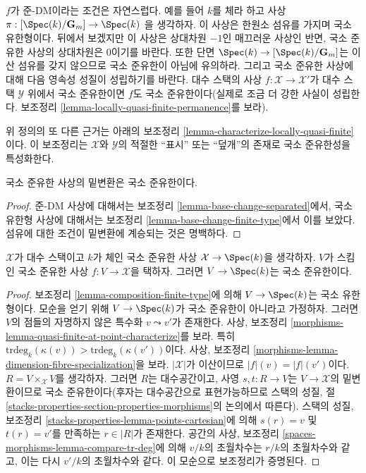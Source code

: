 \noindent
$f$가 준-DM이라는 조건은 자연스럽다. 예를 들어 $k$를 체라 하고 사상
$\pi : [\Spec(k)/\mathbf{G}_m] \to \Spec(k)$
을 생각하자. 이 사상은 한원소 섬유를 가지며 국소 유한형이다.
뒤에서 보겠지만 이 사상은 상대차원 $-1$인 매끄러운 사상인 반면,
국소 준유한 사상의 상대차원은 $0$이기를 바란다. 또한 단면
$\Spec(k) \to [\Spec(k)/\mathbf{G}_m]$는 이산 섬유를 갖지 않으므로
국소 준유한이 아님에 유의하라. 그리고 국소 준유한 사상에 대해 다음
영속성 성질이 성립하기를 바란다. 대수 스택의 사상
$f : \mathcal{X} \to \mathcal{X}'$가 대수 스택 $\mathcal{Y}$ 위에서
국소 준유한이면 $f$도 국소 준유한이다(실제로 조금 더 강한 사실이
성립한다. 보조정리 \ref{lemma-locally-quasi-finite-permanence}를 보라).

\medskip\noindent
위 정의의 또 다른 근거는 아래의 보조정리
\ref{lemma-characterize-locally-quasi-finite}이다. 이 보조정리는
$\mathcal{X}$와 $\mathcal{Y}$의 적절한 ``표시'' 또는 ``덮개''의 존재로
국소 준유한성을 특성화한다.

\begin{lemma}
\label{lemma-base-change-locally-quasi-finite}
국소 준유한 사상의 밑변환은 국소 준유한이다.
\end{lemma}

\begin{proof}
준-DM 사상에 대해서는 보조정리 \ref{lemma-base-change-separated}에서,
국소 유한형 사상에 대해서는 보조정리
\ref{lemma-base-change-finite-type}에서 이를 보았다. 섬유에 대한 조건이
밑변환에 계승되는 것은 명백하다.
\end{proof}

\begin{lemma}
\label{lemma-locally-quasi-finite-over-field}
$\mathcal{X}$가 대수 스택이고 $k$가 체인 국소 준유한 사상
$\mathcal{X} \to \Spec(k)$을 생각하자. $V$가 스킴인 국소 준유한 사상
$f : V \to \mathcal{X}$을 택하자. 그러면 $V \to \Spec(k)$는 국소
준유한이다.
\end{lemma}

\begin{proof}
보조정리 \ref{lemma-composition-finite-type}에 의해
$V \to \Spec(k)$는 국소 유한형이다. 모순을 얻기 위해
$V \to \Spec(k)$가 국소 준유한이 아니라고 가정하자. 그러면 $V$의
점들의 자명하지 않은 특수화 $v \leadsto v'$가 존재한다. 사상,
보조정리 \ref{morphisms-lemma-quasi-finite-at-point-characterize}를 보라.
특히 $\text{trdeg}_k(\kappa(v)) > \text{trdeg}_k(\kappa(v'))$이다. 사상,
보조정리 \ref{morphisms-lemma-dimension-fibre-specialization}을 보라.
$|\mathcal{X}|$가 이산이므로 $|f|(v) = |f|(v')$이다.
$R = V \times_\mathcal{X} V$를 생각하자. 그러면 $R$는 대수공간이고,
사영 $s, t : R \to V$는 $V \to \mathcal{X}$의 밑변환이므로 국소
준유한이다(후자는 대수공간으로 표현가능하므로 스택의 성질, 절
\ref{stacks-properties-section-properties-morphisms}의 논의에서 따른다).
스택의 성질, 보조정리
\ref{stacks-properties-lemma-points-cartesian}에 의해 $s(r) = v$ 및
$t(r) = v'$를 만족하는 $r \in |R|$가 존재한다. 공간의 사상,
보조정리 \ref{spaces-morphisms-lemma-compare-tr-deg}에 의해 $v/k$의
초월차수는 $r/k$의 초월차수와 같고, 이는 다시 $v'/k$의 초월차수와
같다. 이 모순으로 보조정리가 증명된다.
\end{proof}


